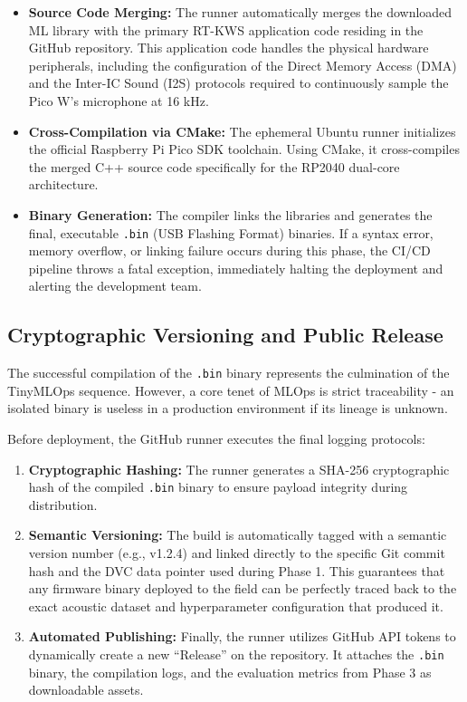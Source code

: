 \documentclass[11pt,a4paper,openany]{book}
\begin{document}
\begin{itemize}
    \item \textbf{Source Code Merging:} The runner automatically merges the downloaded ML library with the primary RT-KWS application code residing in the GitHub repository. This application code handles the physical hardware peripherals, including the configuration of the Direct Memory Access (DMA) and the Inter-IC Sound (I2S) protocols required to continuously sample the Pico W's microphone at 16 kHz.
    \item \textbf{Cross-Compilation via CMake:} The ephemeral Ubuntu runner initializes the official Raspberry Pi Pico SDK toolchain. Using CMake, it cross-compiles the merged C++ source code specifically for the RP2040 dual-core architecture.
    \item \textbf{Binary Generation:} The compiler links the libraries and generates the final, executable \texttt{.bin} (USB Flashing Format) binaries. If a syntax error, memory overflow, or linking failure occurs during this phase, the CI/CD pipeline throws a fatal exception, immediately halting the deployment and alerting the development team.
\end{itemize}

\subsection{Cryptographic Versioning and Public Release}
The successful compilation of the \texttt{.bin} binary represents the culmination of the TinyMLOps sequence. However, a core tenet of MLOps is strict traceability - an isolated binary is useless in a production environment if its lineage is unknown.

Before deployment, the GitHub runner executes the final logging protocols:
\begin{enumerate}
    \item \textbf{Cryptographic Hashing:} The runner generates a SHA-256 cryptographic hash of the compiled \texttt{.bin} binary to ensure payload integrity during distribution.
    \item \textbf{Semantic Versioning:} The build is automatically tagged with a semantic version number (e.g., v1.2.4) and linked directly to the specific Git commit hash and the DVC data pointer used during Phase 1. This guarantees that any firmware binary deployed to the field can be perfectly traced back to the exact acoustic dataset and hyperparameter configuration that produced it.
    \item \textbf{Automated Publishing:} Finally, the runner utilizes GitHub API tokens to dynamically create a new ``Release'' on the repository. It attaches the \texttt{.bin} binary, the compilation logs, and the evaluation metrics from Phase 3 as downloadable assets.
\end{enumerate}
\end{document}
